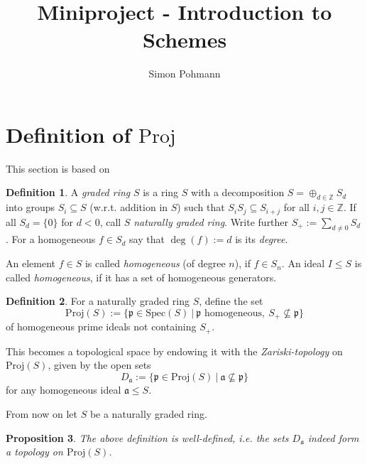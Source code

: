 \documentclass{scrartcl}
\title{Miniproject - Introduction to Schemes}
\author{Simon Pohmann}
\newcommand{\Z}{\mathbb{Z}}
\newcommand{\p}{\mathfrak{p}}
\renewcommand{\a}{\mathfrak{a}}
\newcommand{\Spec}{\mathrm{Spec}}
\newcommand{\Proj}{\mathrm{Proj}}
\newtheorem{prop}{Proposition}
\theoremstyle{definition}
\newtheorem{definition}[prop]{Definition}
\begin{document}
\maketitle

\section{Definition of $\Proj$}

This section is based on \cite[II.2]{hartshorne}
\begin{definition}
    A \emph{graded ring} $S$ is a ring $S$ with a decomposition $S = \oplus_{d \in \Z} S_d$ into groups $S_i \subseteq S$ (w.r.t. addition in $S$) such that $S_i S_j \subseteq S_{i + j}$ for all $i, j \in \Z$.
    If all $S_d = \{ 0 \}$ for $d < 0$, call $S$ \emph{naturally graded ring}.
    Write further $S_+ := \sum_{d \neq 0} S_d$.
    For a homogeneous $f \in S_d$ say that $\deg(f) := d$ is its \emph{degree}.

    An element $f \in S$ is called \emph{homogeneous} (of degree $n$), if $f \in S_n$.
    An ideal $I \leq S$ is called \emph{homogeneous}, if it has a set of homogeneous generators.
\end{definition}
\begin{definition}
    For a naturally graded ring $S$, define the set
    \begin{equation*}
        \Proj(S) := \{ \p \in \Spec(S) \ | \ \text{$\p$ homogeneous}, \ S_+ \not\subseteq \p \}
    \end{equation*}
    of homogeneous prime ideals not containing $S_+$.

    This becomes a topological space by endowing it with the \emph{Zariski-topology} on $\Proj(S)$, given by the open sets
    \begin{equation*}
        D_{\a} := \{ \p \in \Proj(S) \ | \ \a \not\subseteq \p \}
    \end{equation*}
    for any homogeneous ideal $\a \leq S$.
\end{definition}
From now on let $S$ be a naturally graded ring.
\begin{prop}
    The above definition is well-defined, i.e. the sets $D_\a$ indeed form a topology on $\Proj(S)$.
\end{prop}
\end{document}
